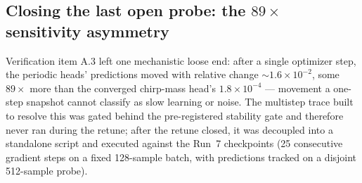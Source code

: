 \documentclass[11pt]{article}
\begin{document}
\subsection{Closing the last open probe: the $89\times$ sensitivity asymmetry}
\label{sec:phicpsi:asymmetry}

Verification item A.3 left one mechanistic loose end: after a single optimizer step, the periodic heads' predictions moved with relative change ${\sim}1.6 \times 10^{-2}$, some $89\times$ more than the converged chirp-mass head's $1.8 \times 10^{-4}$ --- movement a one-step snapshot cannot classify as slow learning or noise.
The multistep trace built to resolve this was gated behind the pre-registered stability gate and therefore never ran during the retune; after the retune closed, it was decoupled into a standalone script and executed against the Run~7 checkpoints (25 consecutive gradient steps on a fixed 128-sample batch, with predictions tracked on a disjoint 512-sample probe).
\end{document}

